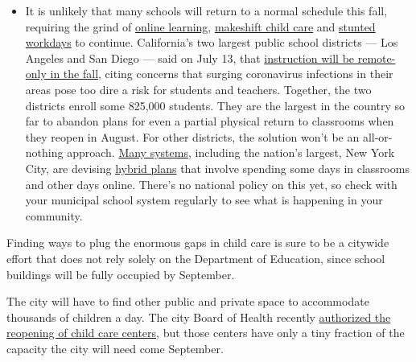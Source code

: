 \begin{itemize}
  \begin{itemize}
  \tightlist
  \item
    It is unlikely that many schools will return to a normal schedule
    this fall, requiring the grind of
    \href{https://www.nytimes.com/2020/06/05/us/coronavirus-education-lost-learning.html?action=click\&pgtype=Article\&state=default\&region=MAIN_CONTENT_3\&context=storylines_faq}{online
    learning},
    \href{https://www.nytimes.com/2020/05/29/us/coronavirus-child-care-centers.html?action=click\&pgtype=Article\&state=default\&region=MAIN_CONTENT_3\&context=storylines_faq}{makeshift
    child care} and
    \href{https://www.nytimes.com/2020/06/03/business/economy/coronavirus-working-women.html?action=click\&pgtype=Article\&state=default\&region=MAIN_CONTENT_3\&context=storylines_faq}{stunted
    workdays} to continue. California's two largest public school
    districts --- Los Angeles and San Diego --- said on July 13, that
    \href{https://www.nytimes.com/2020/07/13/us/lausd-san-diego-school-reopening.html?action=click\&pgtype=Article\&state=default\&region=MAIN_CONTENT_3\&context=storylines_faq}{instruction
    will be remote-only in the fall}, citing concerns that surging
    coronavirus infections in their areas pose too dire a risk for
    students and teachers. Together, the two districts enroll some
    825,000 students. They are the largest in the country so far to
    abandon plans for even a partial physical return to classrooms when
    they reopen in August. For other districts, the solution won't be an
    all-or-nothing approach.
    \href{https://bioethics.jhu.edu/research-and-outreach/projects/eschool-initiative/school-policy-tracker/}{Many
    systems}, including the nation's largest, New York City, are
    devising
    \href{https://www.nytimes.com/2020/06/26/us/coronavirus-schools-reopen-fall.html?action=click\&pgtype=Article\&state=default\&region=MAIN_CONTENT_3\&context=storylines_faq}{hybrid
    plans} that involve spending some days in classrooms and other days
    online. There's no national policy on this yet, so check with your
    municipal school system regularly to see what is happening in your
    community.
  \end{itemize}
\end{itemize}

Finding ways to plug the enormous gaps in child care is sure to be a
citywide effort that does not rely solely on the Department of
Education, since school buildings will be fully occupied by September.

The city will have to find other public and private space to accommodate
thousands of children a day. The city Board of Health recently
\href{https://ny.chalkbeat.org/2020/7/7/21316621/nyc-preschools-can-reopen}{authorized
the reopening of child care centers}, but those centers have only a tiny
fraction of the capacity the city will need come September.

